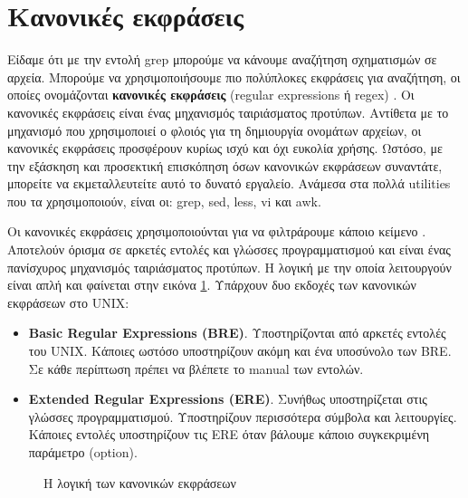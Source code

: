 \section{Κανονικές εκφράσεις}



Είδαμε ότι με την εντολή grep μπορούμε να  κάνουμε αναζήτηση σχηματισμών σε αρχεία. Μπορούμε να χρησιμοποιήσουμε πιο πολύπλοκες εκφράσεις
για αναζήτηση, οι οποίες ονομάζονται \textbf{κανονικές εκφράσεις} (regular expressions ή regex) \cite{nemeth2011unix}\cite{kochan2016shell}. Οι κανονικές εκφράσεις είναι ένας
μηχανισμός ταιριάσματος προτύπων. Αντίθετα με το μηχανισμό που χρησιμοποιεί ο φλοιός για τη δημιουργία ονομάτων αρχείων, οι κανονικές
εκφράσεις προσφέρουν κυρίως ισχύ και όχι ευκολία χρήσης. Ωστόσο, με την εξάσκηση και προσεκτική επισκόπηση όσων κανονικών εκφράσεων
συναντάτε, μπορείτε να εκμεταλλευτείτε αυτό το δυνατό εργαλείο. Ανάμεσα στα πολλά utilities που τα χρησιμοποιούν, είναι οι: grep, sed, less, vi και awk.

Οι κανονικές εκφράσεις χρησιμοποιούνται για να φιλτράρουμε κάποιο κείμενο \cite{blum2008linux}. Αποτελούν όρισμα σε αρκετές εντολές και γλώσσες προγραμματισμού και είναι ένας πανίσχυρος μηχανισμός ταιριάσματος προτύπων. Η λογική με την οποία λειτουργούν είναι απλή και φαίνεται στην εικόνα \ref{fig:reg-ex}.
Υπάρχουν δυο εκδοχές των κανονικών εκφράσεων στο UNIX:
\begin{itemize}
	\item \textbf{Basic Regular Expressions (BRE)}. Υποστηρίζονται από αρκετές εντολές του UNIX. Κάποιες ωστόσο υποστηρίζουν ακόμη και ένα υποσύνολο των BRE. Σε κάθε περίπτωση πρέπει να βλέπετε το manual των εντολών.
	\item \textbf{Extended Regular Expressions (ERE)}. Συνήθως υποστηρίζεται στις γλώσσες προγραμματισμού. Υποστηρίζουν περισσότερα σύμβολα και λειτουργίες. Κάποιες εντολές υποστηρίζουν τις ERE όταν βάλουμε κάποιο συγκεκριμένη παράμετρο (option).
\end{itemize}

\begin{figure}
	\centering
	\caption{Η λογική των κανονικών εκφράσεων}
	\label{fig:reg-ex}
\end{figure} 

